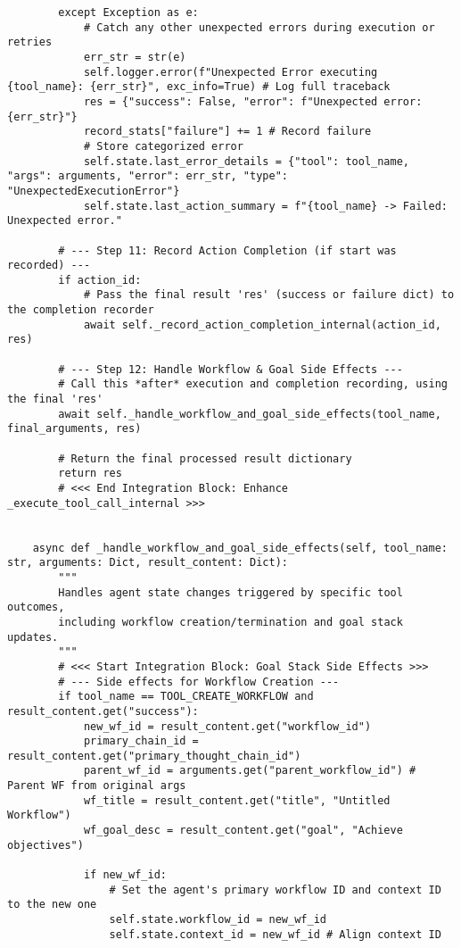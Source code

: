 \documentclass[12pt,a4paper]{article}
\begin{document}
\begin{pageablecode}
\begin{verbatim}
        except Exception as e:
            # Catch any other unexpected errors during execution or retries
            err_str = str(e)
            self.logger.error(f"Unexpected Error executing {tool_name}: {err_str}", exc_info=True) # Log full traceback
            res = {"success": False, "error": f"Unexpected error: {err_str}"}
            record_stats["failure"] += 1 # Record failure
            # Store categorized error
            self.state.last_error_details = {"tool": tool_name, "args": arguments, "error": err_str, "type": "UnexpectedExecutionError"}
            self.state.last_action_summary = f"{tool_name} -> Failed: Unexpected error."

        # --- Step 11: Record Action Completion (if start was recorded) ---
        if action_id:
            # Pass the final result 'res' (success or failure dict) to the completion recorder
            await self._record_action_completion_internal(action_id, res)

        # --- Step 12: Handle Workflow & Goal Side Effects ---
        # Call this *after* execution and completion recording, using the final 'res'
        await self._handle_workflow_and_goal_side_effects(tool_name, final_arguments, res)

        # Return the final processed result dictionary
        return res
        # <<< End Integration Block: Enhance _execute_tool_call_internal >>>


    async def _handle_workflow_and_goal_side_effects(self, tool_name: str, arguments: Dict, result_content: Dict):
        """
        Handles agent state changes triggered by specific tool outcomes,
        including workflow creation/termination and goal stack updates.
        """
        # <<< Start Integration Block: Goal Stack Side Effects >>>
        # --- Side effects for Workflow Creation ---
        if tool_name == TOOL_CREATE_WORKFLOW and result_content.get("success"):
            new_wf_id = result_content.get("workflow_id")
            primary_chain_id = result_content.get("primary_thought_chain_id")
            parent_wf_id = arguments.get("parent_workflow_id") # Parent WF from original args
            wf_title = result_content.get("title", "Untitled Workflow")
            wf_goal_desc = result_content.get("goal", "Achieve objectives")

            if new_wf_id:
                # Set the agent's primary workflow ID and context ID to the new one
                self.state.workflow_id = new_wf_id
                self.state.context_id = new_wf_id # Align context ID


\end{verbatim}
\end{pageablecode}
\end{document}

